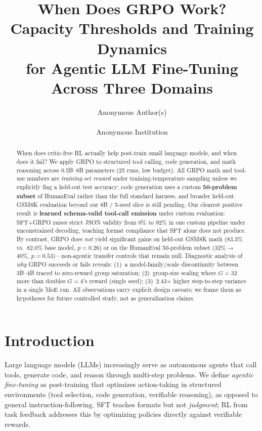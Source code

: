 \documentclass{article}
\title{When Does GRPO Work? Capacity Thresholds and Training Dynamics\\for Agentic LLM Fine-Tuning Across Three Domains}
\author{
  Anonymous Author(s)\\
  \\
  Anonymous Institution
}
\begin{document}
\maketitle

\begin{abstract}
  When does critic-free RL actually help post-train small language models, and when does it fail? We apply GRPO to structured tool calling, code generation, and math reasoning across 0.5B--8B parameters (25 runs, low budget). All GRPO math and tool-use numbers are \emph{training-set reward} under training-temperature sampling unless we explicitly flag a held-out test accuracy; code generation uses a custom \textbf{50-problem subset} of HumanEval rather than the full standard harness, and broader held-out GSM8K evaluation beyond our 8B / 5-seed slice is still pending. Our clearest positive result is \textbf{learned schema-valid tool-call emission} under custom evaluation: SFT+GRPO raises strict JSON validity from 0\% to 92\% in one custom pipeline under unconstrained decoding, teaching format compliance that SFT alone does not produce. By contrast, GRPO does \emph{not} yield significant gains on held-out GSM8K math (83.3\% vs.\ 82.0\% base model, $p{=}0.26$) or on the HumanEval 50-problem subset (32\%$\rightarrow$40\%, $p{=}0.53$)---non-agentic transfer controls that remain null. Diagnostic analysis of \emph{why} GRPO succeeds or fails reveals: (1)~a model-family/scale discontinuity between 3B--4B traced to zero-reward group saturation; (2)~group-size scaling where $G{=}32$ more than doubles $G{=}4$'s reward (single seed); (3)~2.43$\times$ higher step-to-step variance in a single MoE run. All observations carry explicit design caveats; we frame them as hypotheses for future controlled study, not as generalization claims.
\end{abstract}

\section{Introduction}

Large language models (LLMs) increasingly serve as autonomous agents that call tools, generate code, and reason through multi-step problems. We define \emph{agentic fine-tuning} as post-training that optimizes action-taking in structured environments (tool selection, code generation, verifiable reasoning), as opposed to general instruction-following. SFT teaches formats but not \emph{judgment}; RL from task feedback addresses this by optimizing policies directly against verifiable rewards.
\end{document}
